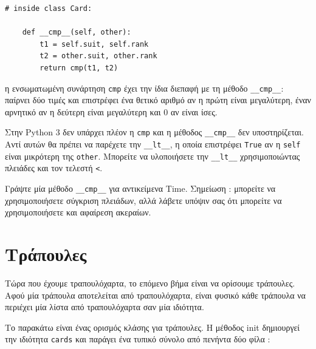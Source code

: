 \documentclass[10pt]{book}
\begin{document}
\begin{verbatim}
# inside class Card:

    def __cmp__(self, other):
        t1 = self.suit, self.rank
        t2 = other.suit, other.rank
        return cmp(t1, t2)
\end{verbatim}
%
 η ενσωματωμένη συνάρτηση  {\tt cmp}  έχει την ίδια διεπαφή με τη μέθοδο  
\verb"__cmp__":  παίρνει δύο τιμές και επιστρέφει ένα θετικό αριθμό αν η πρώτη είναι 
μεγαλύτερη, έναν αρνητικό αν η δεύτερη είναι μεγαλύτερη και 0 αν είναι ίσες.

Στην  Python 3  δεν υπάρχει πλέον η  {\tt cmp}  και η μέθοδος  \verb"__cmp__"  δεν υποστηρίζεται.  Αντί αυτών θα πρέπει να παρέχετε την  \verb"__lt__",  η οποία επιστρέφει  {\tt True}  αν η  {\tt self}  είναι 
μικρότερη της  {\tt other}.   Μπορείτε να υλοποιήσετε την  \verb"__lt__"  χρησιμοποιώντας πλειάδες και τον τελεστή  \verb"<".


 
\begin{exercise}

Γράψτε μία μέθοδο  \verb"__cmp__"  για αντικείμενα  Time.   Σημείωση : 
 μπορείτε να χρησιμοποιήσετε σύγκριση πλειάδων, αλλά λάβετε υπόψιν σας ότι μπορείτε 
να χρησιμοποιήσετε και αφαίρεση ακεραίων.	

\end{exercise}




\section{Τράπουλες}

Τώρα που έχουμε τραπουλόχαρτα, το επόμενο βήμα είναι να ορίσουμε τράπουλες.  Αφού μία 
τράπουλα αποτελείται από τραπουλόχαρτα, είναι φυσικό κάθε τράπουλα να περιέχει μία λίστα 
από τραπουλόχαρτα σαν μία ιδιότητα.

Το παρακάτω είναι ένας ορισμός κλάσης για τράπουλες.  Η μέθοδος  init  δημιουργεί 
την ιδιότητα  {\tt cards}  και παράγει ένα τυπικό σύνολο από πενήντα δύο φίλα :
\end{document}
